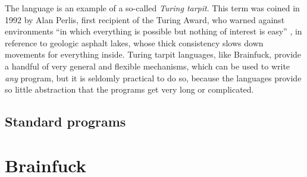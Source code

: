 \documentclass{sig-alternate}
\begin{document}
The language is an example of a so-called \emph{Turing tarpit}. This term was coined in 1992 by Alan Perlis, first recipient of the Turing Award, who warned against environments “in which everything is possible but nothing of interest is easy” \cite{perlis1982epigrams}, in reference to geologic asphalt lakes, whose thick consistency slows down movements for everything inside. Turing tarpit languages, like Brainfuck, provide a handful of very general and flexible mechanisms, which can be used to write \emph{any} program, but it is seldomly practical to do so, because the languages provide so little abstraction that the programs get very long or complicated.

\subsection{Standard programs}




\newpage
\section{Brainfuck}
\end{document}
